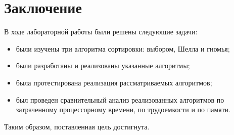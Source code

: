 \chapter*{Заключение}

В ходе лабораторной работы были решены следующие задачи:

\begin{itemize}
	\item были изучены три алгоритма сортировки: выбором, Шелла и гномья;
	\item были разработаны и реализованы указанные алгоритмы;
	\item была протестирована реализация рассматриваемых алгоритмов;
	\item был проведен сравнительный анализ реализованных алгоритмов по затраченному процессорному времени, по трудоемкости и по памяти.
\end{itemize}

Таким образом, поставленная цель достигнута.
